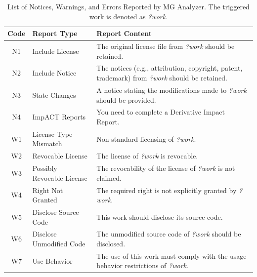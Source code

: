 \begin{table}[tp]
    \caption{List of \textcolor{Ruling}{Notices}, \textcolor{Construct}{Warnings}, and \textcolor{Request}{Errors} Reported by MG Analyzer. The triggered work is denoted as \emph{?work}. }
    \tiny
    \label{tab:report}
    \begin{tabular}{|c|p{1.9cm}|p{5cm}|}
    \hline
    \rowcolor[gray]{.8}
    Code & Report Type & Report Content \\ \hline
    
    N1 & \textcolor{Ruling}{Include License} & The original license file from \emph{?work} should be retained.  \\ \hline

    N2 & \textcolor{Ruling}{Include Notice} & The notices (e.g., attribution, copyright, patent, trademark) from \emph{?work} should be retained. \\ \hline

    N3 &\textcolor{Ruling}{State Changes} & A notice stating the modifications made to \emph{?work} should be provided. \\ \hline

    N4 &\textcolor{Ruling}{ImpACT Reports} & You need to complete a Derivative Impact Report. \\ \hline

    W1 &\textcolor{Construct}{License Type Mismatch} & Non-standard licensing of \emph{?work}. \\ \hline
    
    W2 &\textcolor{Construct}{Revocable License} & The license of \emph{?work} is revocable. \\ \hline
    
    W3 &\textcolor{Construct}{Possibly Revocable License} & The revocability of the license of \emph{?work} is not claimed. \\ \hline

    W4 &\textcolor{Construct}{Right Not Granted} & The required right is not explicitly granted by \emph{?work}. \\ \hline

    W5 &\textcolor{Construct}{Disclose Source Code} & This work should disclose its source code. \\ \hline

    W6 &\textcolor{Construct}{Disclose Unmodified Code} & The unmodified source code of \emph{?work} should be disclosed. \\ \hline

    W7 &\textcolor{Construct}{Use Behavior} & The use of this work must comply with the usage behavior restrictions of \emph{?work}. \\ \hline


\end{tabular}
\end{table}
